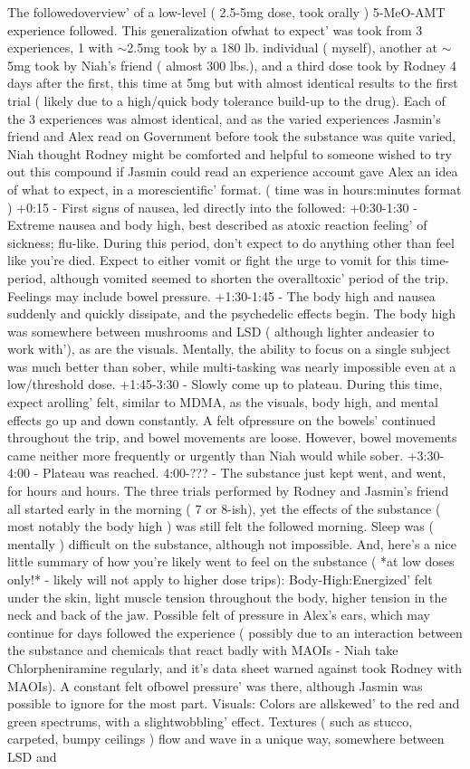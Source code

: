 \documentclass[12pt]{book}
\begin{document}
The followedoverview' of a low-level ( 2.5-5mg dose, took orally ) 5-MeO-AMT experience followed. This generalization ofwhat to expect' was took from 3 experiences, 1 with $\sim$2.5mg took by a 180 lb. individual ( myself), another at $\sim$5mg took by Niah's friend ( almost 300 lbs.), and a third dose took by Rodney 4 days after the first, this time at 5mg but with almost identical results to the first trial ( likely due to a high/quick body tolerance build-up to the drug). Each of the 3 experiences was almost identical, and as the varied experiences Jasmin's friend and Alex read on Government before took the substance was quite varied, Niah thought Rodney might be comforted and helpful to someone wished to try out this compound if Jasmin could read an experience account gave Alex an idea of what to expect, in a morescientific' format. ( time was in hours:minutes format ) +0:15 - First signs of nausea, led directly into the followed: +0:30-1:30 - Extreme nausea and body high, best described as atoxic reaction feeling' of sickness; flu-like. During this period, don't expect to do anything other than feel like you're died. Expect to either vomit or fight the urge to vomit for this time-period, although vomited seemed to shorten the overalltoxic' period of the trip. Feelings may include bowel pressure. +1:30-1:45 - The body high and nausea suddenly and quickly dissipate, and the psychedelic effects begin. The body high was somewhere between mushrooms and LSD ( although lighter andeasier to work with'), as are the visuals. Mentally, the ability to focus on a single subject was much better than sober, while multi-tasking was nearly impossible even at a low/threshold dose. +1:45-3:30 - Slowly come up to plateau. During this time, expect arolling' felt, similar to MDMA, as the visuals, body high, and mental effects go up and down constantly. A felt ofpressure on the bowels' continued throughout the trip, and bowel movements are loose. However, bowel movements came neither more frequently or urgently than Niah would while sober. +3:30-4:00 - Plateau was reached. 4:00-??? - The substance just kept went, and went, for hours and hours. The three trials performed by Rodney and Jasmin's friend all started early in the morning ( 7 or 8-ish), yet the effects of the substance ( most notably the body high ) was still felt the followed morning. Sleep was ( mentally ) difficult on the substance, although not impossible. And, here's a nice little summary of how you're likely went to feel on the substance ( *at low doses only!* - likely will not apply to higher dose trips): Body-High:Energized' felt under the skin, light muscle tension throughout the body, higher tension in the neck and back of the jaw. Possible felt of pressure in Alex's ears, which may continue for days followed the experience ( possibly due to an interaction between the substance and chemicals that react badly with MAOIs - Niah take Chlorpheniramine regularly, and it's data sheet warned against took Rodney with MAOIs). A constant felt ofbowel pressure' was there, although Jasmin was possible to ignore for the most part. Visuals: Colors are allskewed' to the red and green spectrums, with a slightwobbling' effect. Textures ( such as stucco, carpeted, bumpy ceilings ) flow and wave in a unique way, somewhere between LSD and 
\end{document}
